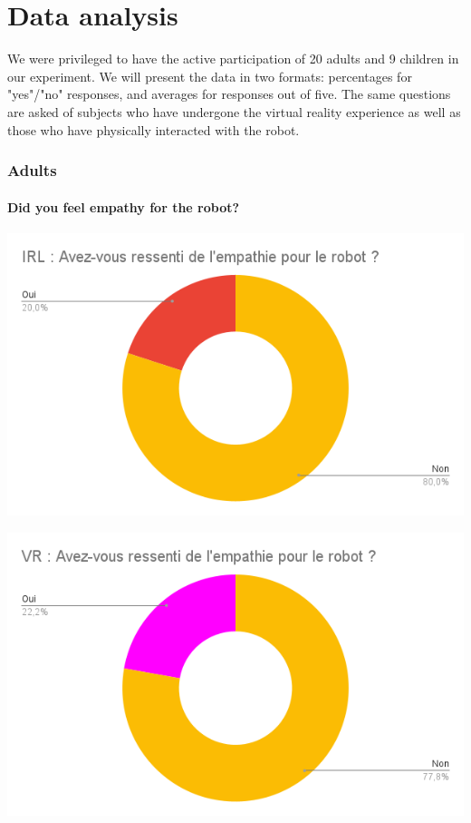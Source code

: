 \chapter{Data analysis}

We were privileged to have the active participation of 20 adults and 9 children in our experiment. We will present the data in two formats: percentages for "yes"/"no" responses, and averages for responses out of five. The same questions are asked of subjects who have undergone the virtual reality experience as well as those who have physically interacted with the robot.\\
\subsection{Adults}

    \subsubsection{Did you feel empathy for the robot?}
    \begin{minipage}{.5\textwidth}%
    \includegraphics[width=\textwidth]{Datas/IRL _ Avez-vous ressenti de l'empathie pour le robot _.png}
    \end{minipage}%
    \begin{minipage}{.5\textwidth}%
    \includegraphics[width=\textwidth]{Datas/VR _ Avez-vous ressenti de l'empathie pour le robot _.png}
    \end{minipage}%
    \vspace*{0.5cm}
    
